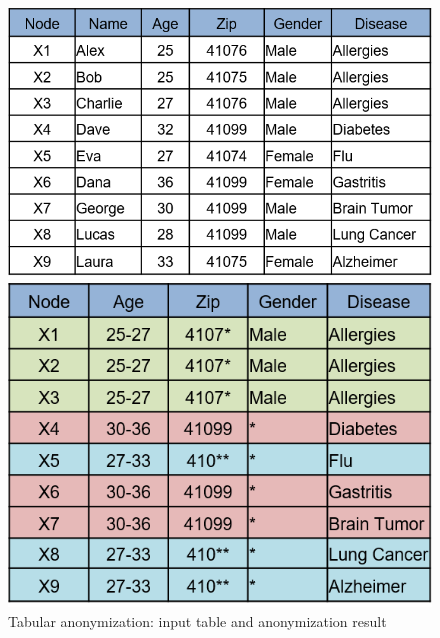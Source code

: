 \documentclass{llncs}
\begin{document}
\begin{figure}[h]
	\centering
	\begin{minipage}[b]{0.535\textwidth}
		\includegraphics[width=\textwidth]{figures/theory/k_anon_input}
	\end{minipage}
	\hfill
	\begin{minipage}[b]{0.448\textwidth}
		\includegraphics[width=\textwidth]{figures/theory/k_anon_output}
	\end{minipage}
	\caption{Tabular anonymization: input table and anonymization result}
	\label{fig:anonymized_clusters}
\end{figure}



\end{document}

